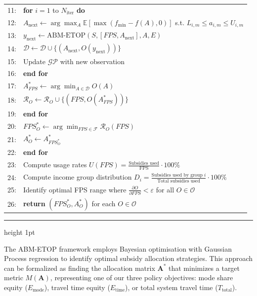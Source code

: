 \documentclass[a4paper,fleqn]{cas-sc}
\begin{document}
\begin{table}[width=\textwidth]
\begin{tabular}{p{}p{}}
11: & \hspace{2em} \textbf{for} $i = 1$ to $N_{\text{iter}}$ \textbf{do} \\
12: & \hspace{3em} $A_{\text{next}} \gets \arg\max_{A} \mathbb{E}[\max(f_{\min}-f(A), 0)]$ s.t. $L_{i,m} \leq a_{i,m} \leq U_{i,m}$ \\
13: & \hspace{3em} $y_{\text{next}} \gets \text{ABM-ETOP}(S, [FPS, A_{\text{next}}], A, E)$ \\
14: & \hspace{3em} $\mathcal{D} \gets \mathcal{D} \cup \{(A_{\text{next}}, O(y_{\text{next}}))\}$ \\
15: & \hspace{3em} Update $\mathcal{GP}$ with new observation \\
16: & \hspace{2em} \textbf{end for} \\
17: & \hspace{2em} $A_{FPS}^* \gets \arg\min_{A \in \mathcal{D}} O(A)$ \\
18: & \hspace{2em} $\mathcal{R}_O \gets \mathcal{R}_O \cup \{(FPS, O(A_{FPS}^*))\}$ \\
19: & \hspace{1em} \textbf{end for} \\
20: & \hspace{1em} $FPS_O^* \gets \arg\min_{FPS \in \mathcal{F}} \mathcal{R}_O(FPS)$ \\
21: & \hspace{1em} $A_O^* \gets A_{FPS_O^*}^*$ \\
22: & \textbf{end for} \\
23: & Compute usage rates $U(FPS) = \frac{\text{Subsidies used}}{\text{FPS}} \cdot 100\%$ \\
24: & Compute income group distribution $D_i = \frac{\text{Subsidies used by group }i}{\text{Total subsidies used}} \cdot 100\%$ \\
25: & Identify optimal FPS range where $\frac{\partial O}{\partial FPS} < \varepsilon$ for all $O \in \mathcal{O}$ \\
26: & \textbf{return} $(FPS_O^*, A_O^*)$ for each $O \in \mathcal{O}$ \\
\end{tabular}
\vspace{0.5em}
\hrule height 1pt
\end{table}

The ABM-ETOP framework employs Bayesian optimisation with Gaussian Process regression to identify optimal subsidy allocation strategies. This approach can be formalized as finding the allocation matrix $\mathbf{A}^*$ that minimizes a target metric $M(\mathbf{A})$, representing one of our three policy objectives: mode share equity ($E_{\text{mode}}$), travel time equity ($E_{\text{time}}$), or total system travel time ($T_{\text{total}}$).
\end{document}
